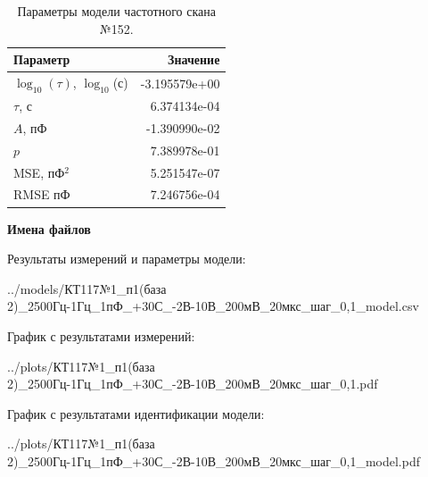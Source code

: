 \begin{table}[!ht]
    \centering
    \caption{Параметры модели частотного скана №152.}
    \begin{tabular}{|l|r|}
        \hline
        Параметр                                       & Значение                  \\ \hline
        $\log_{10}(\tau)$, $\log_{10}$(с)              & -3.195579e+00             \\ \hline
        $\tau$, с                                      & 6.374134e-04              \\ \hline
        $A$, пФ                                        & -1.390990e-02             \\ \hline
        $p$                                            & 7.389978e-01              \\ \hline
        MSE, пФ$^2$                                    & 5.251547e-07              \\ \hline
        RMSE пФ                                        & 7.246756e-04              \\ \hline
    \end{tabular}
    \label{table:frequency_scan_model_152}
\end{table}

\textbf{Имена файлов}

Результаты измерений и параметры модели:

\scriptsize../models/КТ117№1\_п1(база 2)\_2500Гц-1Гц\_1пФ\_+30С\_-2В-10В\_200мВ\_20мкс\_шаг\_0,1\_model.csv
\normalsize

График с результатами измерений:

\scriptsize../plots/КТ117№1\_п1(база 2)\_2500Гц-1Гц\_1пФ\_+30С\_-2В-10В\_200мВ\_20мкс\_шаг\_0,1.pdf
\normalsize

График с результатами идентификации модели:

\scriptsize../plots/КТ117№1\_п1(база 2)\_2500Гц-1Гц\_1пФ\_+30С\_-2В-10В\_200мВ\_20мкс\_шаг\_0,1\_model.pdf
\normalsize

